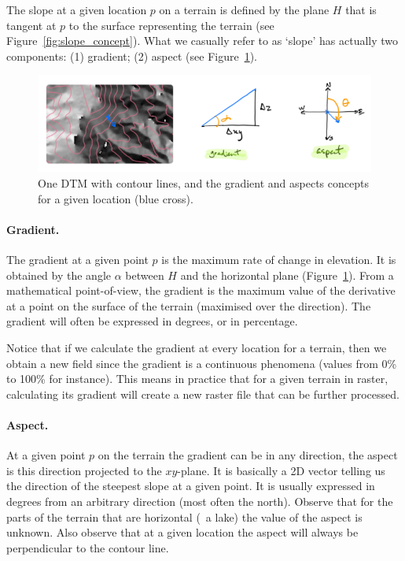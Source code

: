 The slope at a given location $p$ on a terrain is defined by the plane $H$ that is tangent at $p$ to the surface representing the terrain (see Figure~\ref{fig:slope_concept}).
What we casually refer to as `slope' has actually two components: (1) gradient; (2) aspect (see Figure~\ref{fig:slope_aspect}).%
\begin{figure}
  \centering
  \includegraphics[width=\linewidth]{figs/slope_aspect}
  \caption{One DTM with contour lines, and the gradient and aspects concepts for a given location (blue cross).}%
\label{fig:slope_aspect}
\end{figure}


\paragraph{Gradient.} 
The gradient at a given point $p$ is the maximum rate of change in elevation. 
It is obtained by the angle $\alpha$ between $H$ and the horizontal plane (Figure~\ref{fig:slope_aspect}).
From a mathematical point-of-view, the gradient is the maximum value of the derivative at a point on the surface of the terrain (maximised over the direction).
The gradient will often be expressed in degrees, or in percentage.

Notice that if we calculate the gradient at every location for a terrain, then we obtain a new field since the gradient is a continuous phenomena (values from 0\% to 100\% for instance).
This means in practice that for a given terrain in raster, calculating its gradient will create a new raster file that can be further processed.


\paragraph{Aspect.}
At a given point $p$ on the terrain the gradient can be in any direction, the aspect is this direction projected to the $xy$-plane. 
It is basically a 2D vector telling us the direction of the steepest slope at a given point.
It is usually expressed in degrees from an arbitrary direction (most often the north).
Observe that for the parts of the terrain that are horizontal (\eg\ a lake) the value of the aspect is unknown.
Also observe that at a given location the aspect will always be perpendicular to the contour line.


